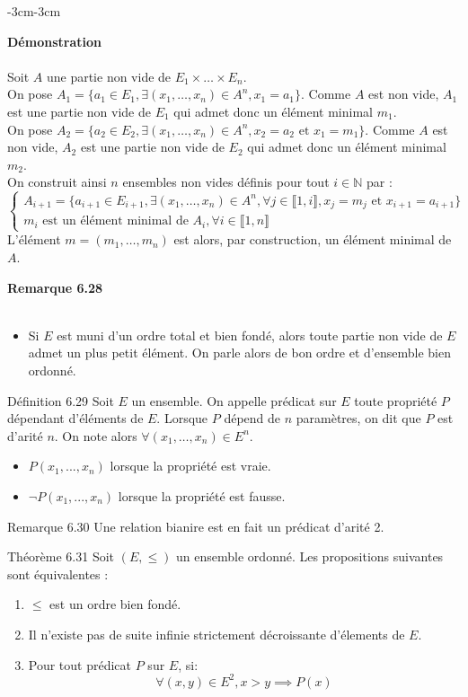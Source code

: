\documentclass{article}
\newenvironment{demonstration}
{
    \begin{boite_demonstration}
    \textbf{\textcolor{rouge_fonce}{Démonstration}}\\ \\
}
{
    \end{boite_demonstration}
    \vspace{15pt}
}
\newenvironment{remarque}[2]
{
    \begin{boite_remarque}
    \textbf{\textcolor{bleu_fonce}{Remarque #1}}\textit{#2} \\ \\
    \begin{itemize}[label=$\blacktriangleright \quad $ ]                    
}
{   
    \end{itemize}
    \end{boite_remarque}
    
}
\begin{document}
\begin{adjustwidth}{-3cm}{-3cm}
    \begin{demonstration}
        Soit $A$ une partie non vide de $E_1 \times \ldots \times E_n$.\\
        On pose $A_1 = \{a_1 \in E_1, \exists (x_1,\ldots,x_n) \in A^n, x_1 = a_1\}$. Comme $A$ est non vide, $A_1$ est une partie non vide de $E_1$ qui admet donc un élément minimal $m_1$.\\
        On pose $A_2 = \{a_2 \in E_2, \exists (x_1,\ldots,x_n) \in A^n, x_2 = a_2 \text{ et } x_1 = m_1\}$. Comme $A$ est non vide, $A_2$ est une partie non vide de $E_2$ qui admet donc un élément minimal $m_2$. \\
        On construit ainsi $n$ ensembles non vides définis pour tout $i \in \mathbb{N}$ par : 
    $$\begin{cases}
        A_{i+1} = \{a_{i+1} \in E_{i+1}, \exists (x_1, \ldots, x_n) \in A^n, \forall j \in \llbracket 1, i \rrbracket, x_j = m_j \text{ et } x_{i+1} = a_{i+1}\} \\
        m_i \text{ est un élément minimal de } A_i, \forall i \in \llbracket 1,n \rrbracket 
    \end{cases}$$
    L'élément $m = (m_1, \ldots, m_n)$ est alors, par construction, un élément minimal de $A$.
    \end{demonstration}

    \begin{remarque}{6.28}{}
        \item Si $E$ est muni d'un ordre total et bien fondé, alors toute partie non vide de $E$ admet un plus petit élément. On parle alors de bon ordre et d'ensemble bien ordonné.
    \end{remarque}

    Définition 6.29
    Soit $E$ un ensemble. On appelle prédicat sur $E$ toute propriété $P$ dépendant d'éléments de $E$.
    Lorsque $P$ dépend de $n$ paramètres, on dit que $P$ est d'arité $n$. On note alors $\forall (x_1, \ldots, x_n) \in E^n$. \begin{itemize}
        \item $P(x_1,...,x_n)$ lorsque la propriété est vraie.
        \item $\lnot P(x_1,...,x_n)$ lorsque la propriété est fausse.
    \end{itemize}

    Remarque 6.30
    Une relation bianire est en fait un prédicat d'arité 2.

    Théorème 6.31
    Soit $(E,\leq)$ un ensemble ordonné. Les propositions suivantes sont équivalentes : \begin{enumerate}
        \item $\leq$ est un ordre bien fondé.
        \item Il n'existe pas de suite infinie strictement décroissante d'élements de $E$.
        \item Pour tout prédicat $P$ sur $E$, si: $$\forall (x,y) \in E^2, x > y \implies P(x)$$
    \end{enumerate}



\end{adjustwidth}
\end{document}
